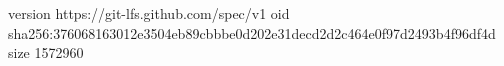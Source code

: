 version https://git-lfs.github.com/spec/v1
oid sha256:376068163012e3504eb89cbbbe0d202e31decd2d2c464e0f97d2493b4f96df4d
size 1572960
